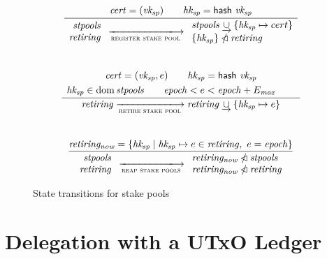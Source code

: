 \documentclass[11pt,a4paper]{article}
\DeclareMathOperator{\dom}{dom}
\newcommand{\restrictdom}{\lhd}
\newcommand{\subtractdom}{\mathbin{\slashed{\restrictdom}}}
\newcommand{\unionoverride}{\mathbin{\underrightarrow\cup}}
\newcommand{\var}[1]{\mathit{#1}}
\newcommand{\fun}[1]{\mathsf{#1}}
\newcommand{\transitionarrow}[2]{\xlongrightarrow[\textsc{#1}]{#2}}
\begin{document}
\begin{figure}

\begin{equation*}
\frac{
  \begin{array}{c}
    \var{cert} = (\var{vk_{sp}}) \qquad
    \var{hk_{sp}} = \fun{hash} ~ \var{vk_{sp}}
  \end{array}
}{
  \begin{array}{r}
    \var{stpools} \\
    \var{retiring}
  \end{array}
  \transitionarrow{register stake pool}{}
  \begin{array}{l}
    \var{stpools} \unionoverride \{\var{hk_{sp}} \mapsto cert\} \\
    \{\var{hk_{sp}}\} \subtractdom \var{retiring}
  \end{array}
}
\end{equation*}
%
\\[1em]
%
\begin{equation*}
\frac{
  \begin{array}{c}
    \var{cert} = (\var{vk_{sp}}, e) \qquad
    \var{hk_{sp}} = \fun{hash} ~ \var{vk_{sp}}
    \\[0.3em]
    \var{hk_{sp}} \in \dom \var{stpools} \qquad
    \var{epoch} < e < \var{epoch} + E_\var{max} \qquad
  \end{array}
}{
  \var{retiring}
  \transitionarrow{retire stake pool}{}
  \var{retiring} \unionoverride \{ \var{hk_{sp}} \mapsto e \}
}
\end{equation*}
%
\\[1em]
%
\begin{equation*}
\frac{
  \var{retiring_{now}} = \{ \var{hk_{sp}} \mid
                            \var{hk_{sp}} \mapsto e \in \var{retiring}, ~
                            e = \var{epoch}
                         \}
}{
  \begin{array}{r}
    \var{stpools} \\
    \var{retiring}
  \end{array}
  \transitionarrow{reap stake pools}{}
  \begin{array}{l}
    \var{retiring_{now}} \subtractdom \var{stpools} \\
    \var{retiring_{now}} \subtractdom \var{retiring}
  \end{array}
}
\end{equation*}

\caption{State transitions for stake pools}
\label{fig:stake_pool_rules}
\end{figure}

\section{Delegation with a UTxO Ledger}




\end{document}
